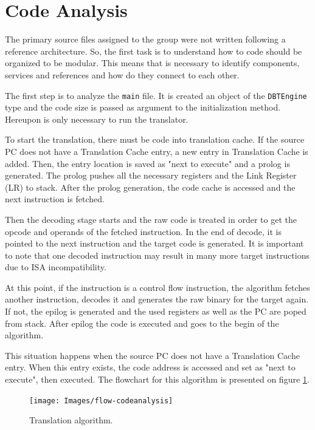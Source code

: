 \documentclass{report}
\begin{document}
	\section{Code Analysis}
	
	\par The primary source files assigned to the group were not written following a reference architecture. So, the first task is to understand how to code should be organized to be modular. This means that is necessary to identify components, services and references and how do they connect to each other.
	\par The first step is to analyze the \texttt{main} file. It is created an object of the \texttt{DBTEngine} type and the code size is passed as argument to the initialization method. Hereupon is only necessary to run the translator.
	\par To start the translation, there must be code into translation cache. If the source PC does not have a Translation Cache entry, a new entry in Translation Cache is added. Then, the entry location is saved as "next to execute" and a prolog is generated. The prolog pushes all the necessary registers and the Link Register (LR) to stack. After the prolog generation, the code cache is accessed and the next instruction is fetched. 
	\par Then the decoding stage starts and the raw code is treated in order to get the opcode and operands of the fetched instruction. In the end of decode, it is pointed to the next instruction and the target code is generated. It is important to note that one decoded instruction may result in many more target instructions due to ISA incompatibility. 
	\par At this point, if the instruction is a control flow instruction, the algorithm fetches another instruction, decodes it and generates the raw binary for the target again. If not, the epilog is generated and the used registers as well as the PC are poped from stack. After epilog the code is executed and goes to the begin of the algorithm.
	\par This situation happens when the source PC does not have a Translation Cache entry. When this entry exists, the code address is accessed and set as "next to execute", then executed. The flowchart for this algorithm is presented on figure \ref{fig:flowchart-codeanalysis}.
	
	\begin{figure} [H]
		\centering
		\texttt{[image: Images/flow-codeanalysis]}
		\caption{Translation algorithm.}
		\label{fig:flowchart-codeanalysis}
	\end{figure}	
	
\end{document}
